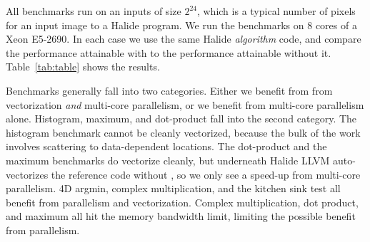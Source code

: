 All benchmarks run on an inputs of size $2^{24}$, which is a typical number of pixels for an input image to a Halide program. We run the benchmarks on 8 cores of a Xeon E5-2690. In each case we use the same Halide \emph{algorithm} code, and compare the performance attainable with  to the performance attainable without it. Table~\ref{tab:table} shows the results.

Benchmarks generally fall into two categories. Either we benefit from from vectorization \emph{and} multi-core parallelism, or we benefit from multi-core parallelism alone. Histogram, maximum, and dot-product fall into the second category. The histogram benchmark cannot be cleanly vectorized, because the bulk of the work involves scattering to data-dependent locations. The dot-product and the maximum benchmarks do vectorize cleanly, but underneath Halide LLVM auto-vectorizes the reference code without , so we only see a speed-up from multi-core parallelism. 4D argmin, complex multiplication, and the kitchen sink test all benefit from parallelism and vectorization. Complex multiplication, dot product, and maximum all hit the memory bandwidth limit, limiting the possible benefit from parallelism.



